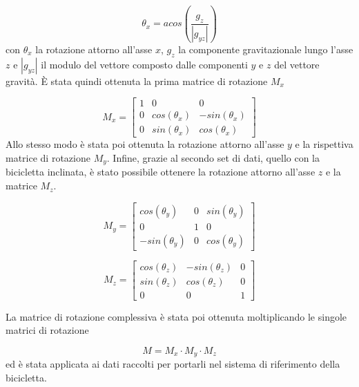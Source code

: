 \documentclass[class=article]{standalone}
\begin{document}
	\[\theta_{x}=acos\left(\frac{g_{z}}{|g_{yz}|}\right)\]
	con \(\theta_{x}\) la rotazione attorno all'asse \(x\), \(g_{z}\) la componente gravitazionale lungo l'asse \(z\) e \(|g_{yz}|\) il modulo del vettore composto dalle componenti \(y\) e \(z\) del vettore gravità. È stata quindi ottenuta la prima matrice di rotazione \(M_{x}\)
	
	\[M_{x}= \begin{bmatrix}
		1 & 0 & 0 \\
		0 & cos(\theta_{x}) & -sin(\theta_{x}) \\
		0 & sin(\theta_{x}) & cos(\theta_{x})
	\end{bmatrix}\]
	Allo stesso modo è stata poi ottenuta la rotazione attorno all'asse \(y\) e la rispettiva matrice di rotazione \(M_{y}\). Infine, grazie al secondo set di dati, quello con la bicicletta inclinata, è stato possibile ottenere la rotazione attorno all'asse \(z\) e la matrice \(M_{z}\).
	
	\[M_{y}=\begin{bmatrix}
		cos(\theta_{y}) & 0 & sin(\theta_{y}) \\
		0 & 1 & 0 \\
		-sin(\theta_{y}) & 0 & cos(\theta_{y})
	\end{bmatrix}\]
	
	\[M_{z}=\begin{bmatrix}
		cos(\theta_{z}) & -sin(\theta_{z}) & 0 \\
		sin(\theta_{z}) & cos(\theta_{z}) & 0 \\
		0 & 0 & 1
	\end{bmatrix}\]
	
	La matrice di rotazione complessiva è stata poi ottenuta moltiplicando le singole matrici di rotazione 
	
	\[M=M_{x}\cdot M_{y}\cdot M_{z}\]
	ed è stata applicata ai dati raccolti per portarli nel sistema di riferimento della bicicletta.
	
\end{document}
